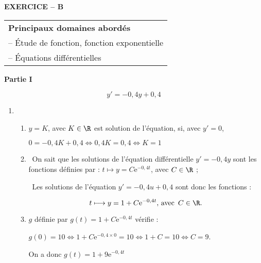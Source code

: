 \textbf{EXERCICE -- B}

\medskip

\begin{tabular}{|l|}\hline
\textbf{Principaux domaines abordés}\\
-- Étude de fonction, fonction exponentielle\\
-- Équations différentielles\\ \hline
\end{tabular}

\bigskip

\textbf{Partie I}

\medskip


\[y'= -0,4y + 0,4\]


\medskip

\begin{enumerate}
\item 
	\begin{enumerate}
		\item %
$y = K$, avec $K \in \R$ est solution de l'équation, si, avec $y' = 0$,
		
$0 = -0,4K + 0,4 \iff 0,4K = 0,4 \iff K = 1$
		\item %
\starredbullet~On sait que les solutions de l'équation différentielle $y' = - 0,4y$ sont les fonctions définies par : $t \longmapsto y = C\text{e}^{-0,4t}$, avec $C \in \R$ ;
		
\starredbullet~Les solutions de l'équation $y' = - 0,4u + 0,4$ sont donc les fonctions :

\[t \longmapsto y = 1 + C\text{e}^{-0,4t},\, \text{avec }\,  C \in \R.\]

\item %
$g$ définie par $g(t) = 1 + C\text{e}^{-0,4t}$ vérifie :

$g(0) = 10 \iff 1 + C\text{e}^{-0,4\times 0} = 10 \iff 1 + C = 10 \iff C = 9$.

On a donc $g(t) = 1 + 9\text{e}^{-0,4t}$
	\end{enumerate}
\end{enumerate}

\bigskip

